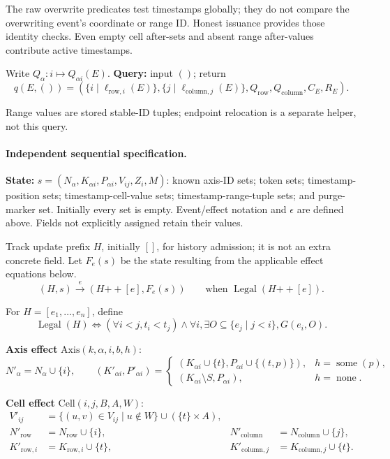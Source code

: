 The raw overwrite predicates test timestamps globally; they do not compare the overwriting event's coordinate or range ID. Honest issuance provides those identity checks. Even empty cell after-sets and absent range after-values contribute active timestamps.

Write $Q_\alpha:i\mapsto Q_{\alpha i}(E)$. \textbf{Query:} input $()$; return
\[
q(E,())=(\{i\mid\ell_{\mathrm{row},i}(E)\},\{j\mid\ell_{\mathrm{column},j}(E)\},Q_{\mathrm{row}},Q_{\mathrm{column}},C_E,R_E).
\]

Range values are stored stable-ID tuples; endpoint relocation is a separate helper, not this query.


\paragraph{Independent sequential specification.}
\textbf{State:} $s=(N_\alpha,K_{\alpha i},P_{\alpha i},V_{ij},Z_i,M)$: known axis-ID sets; token sets; timestamp-position sets; timestamp-cell-value sets; timestamp-range-tuple sets; and purge-marker set. Initially every set is empty. Event/effect notation and $\epsilon$ are defined above. Fields not explicitly assigned retain their values.

Track update prefix $H$, initially $[]$, for history admission; it is not an extra concrete field. Let $F_e(s)$ be the state resulting from the applicable effect equations below.
\[
(H,s)\xrightarrow{e}(H\mathbin{+\!+}[e],F_e(s))\qquad\text{when }\operatorname{Legal}(H\mathbin{+\!+}[e]).
\]

For $H=[e_1,\ldots,e_n]$, define
\[
\operatorname{Legal}(H)\iff(\forall i<j,t_i<t_j)\land\forall i,\exists O\subseteq\{e_j\mid j<i\},G(e_i,O).
\]


\textbf{Axis effect} $\mathrm{Axis}(k,\alpha,i,b,h)$:
\[
N'_\alpha=N_\alpha\cup\{i\},\qquad(K'_{\alpha i},P'_{\alpha i})=\begin{cases}(K_{\alpha i}\cup\{t\},P_{\alpha i}\cup\{(t,p)\}),&h=\operatorname{some}(p),\\(K_{\alpha i}\setminus S,P_{\alpha i}),&h=\operatorname{none}.\end{cases}
\]

\textbf{Cell effect} $\mathrm{Cell}(i,j,B,A,W)$:
\[
\begin{aligned}V'_{ij}&=\{(u,v)\in V_{ij}\mid u\notin W\}\cup(\{t\}\times A),\\N'_{\mathrm{row}}&=N_{\mathrm{row}}\cup\{i\},&N'_{\mathrm{column}}&=N_{\mathrm{column}}\cup\{j\},\\K'_{\mathrm{row},i}&=K_{\mathrm{row},i}\cup\{t\},&K'_{\mathrm{column},j}&=K_{\mathrm{column},j}\cup\{t\}.\end{aligned}
\]

